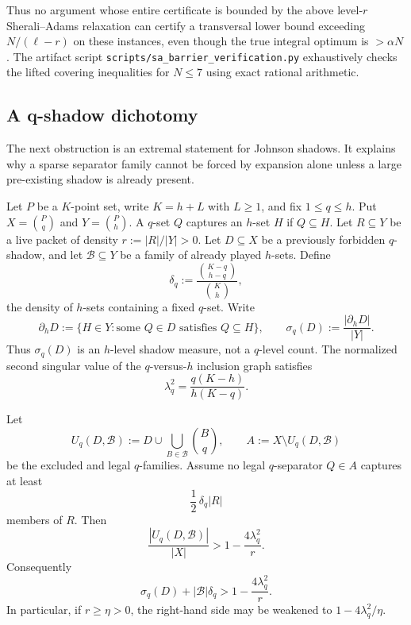 Thus no argument whose entire certificate is bounded by the above level-$r$
Sherali--Adams relaxation can certify a transversal lower bound exceeding
$N/(\ell-r)$ on these instances, even though the true integral optimum is
$>\alpha N$.  The artifact script
\texttt{scripts/sa\_barrier\_verification.py} exhaustively checks the lifted
covering inequalities for $N\le 7$ using exact rational arithmetic.

\subsection{A q-shadow dichotomy}

The next obstruction is an extremal statement for Johnson shadows.  It explains
why a sparse separator family cannot be forced by expansion alone unless a
large pre-existing shadow is already present.

Let $P$ be a $K$-point set, write $K=h+L$ with $L\ge 1$, and fix
$1\le q\le h$.  Put $X=\binom Pq$ and $Y=\binom Ph$.  A $q$-set $Q$ captures an
$h$-set $H$ if $Q\subseteq H$.  Let $R\subseteq Y$ be a live packet of density
$r:=|R|/|Y|>0$.  Let $D\subseteq X$ be a previously forbidden $q$-shadow, and
let $\mathcal B\subseteq Y$ be a family of already played $h$-sets.  Define
\[
  \delta_q:=\frac{\binom{K-q}{h-q}}{\binom{K}{h}},
\]
the density of $h$-sets containing a fixed $q$-set.  Write
\[
  \partial_h D:=\{H\in Y:\text{some }Q\in D\text{ satisfies }Q\subseteq H\},
  \qquad
  \sigma_q(D):=\frac{|\partial_h D|}{|Y|}.
\]
Thus $\sigma_q(D)$ is an $h$-level shadow measure, not a $q$-level count.  The
normalized second singular value of the $q$-versus-$h$ inclusion graph
satisfies
\[
  \lambda_q^2=\frac{q(K-h)}{h(K-q)}.
\]

\begin{proposition}\label{prop:q-shadow-dichotomy}
Let
\[
  U_q(D,\mathcal B):=
  D\cup\bigcup_{B\in\mathcal B}\binom Bq,
  \qquad
  A:=X\setminus U_q(D,\mathcal B)
\]
be the excluded and legal $q$-families.  Assume no legal $q$-separator
$Q\in A$ captures at least
\[
  \frac12\,\delta_q |R|
\]
members of $R$.  Then
\[
  \frac{|U_q(D,\mathcal B)|}{|X|}
  >
  1-\frac{4\lambda_q^2}{r}.
\]
Consequently
\[
  \sigma_q(D)+|\mathcal B|\delta_q
  >
  1-\frac{4\lambda_q^2}{r}.
\]
In particular, if $r\ge\eta>0$, the right-hand side may be weakened to
$1-4\lambda_q^2/\eta$.
\end{proposition}

